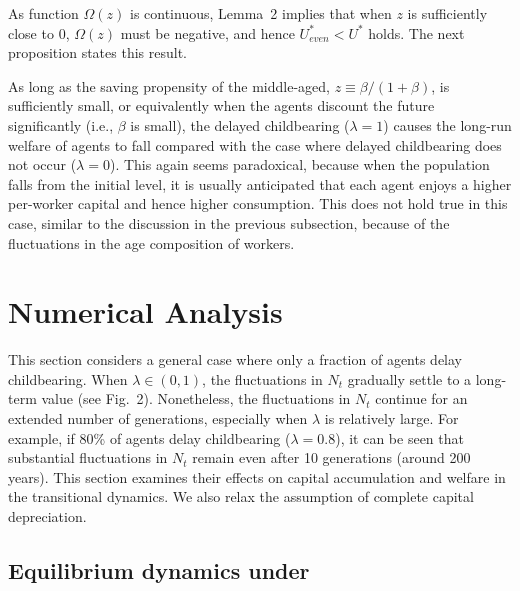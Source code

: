 \documentclass{MBE}%
\begin{document}
{As function $\Omega(z)$ is continuous, Lemma~2 implies that when $z$ is sufficiently close to $0$,
$\Omega(z)$ must be negative, and hence $U^{*}_{even}< U^{*}$ holds. The next proposition states
this result.


As long as the saving propensity of the middle-aged, $z\equiv\beta/(1+\beta)$,
is sufficiently small, or equivalently when the agents discount the future
significantly (i.e., $\beta$ is small), the delayed childbearing ($\lambda=1$)
causes the long-run welfare of agents to fall compared with the case where
delayed childbearing does not occur ($\lambda=0$). This again seems
paradoxical, because when the population falls from the initial level, it is
usually anticipated that each agent enjoys a higher per-worker capital and
hence higher consumption. This does not hold true in this case, similar to the
discussion in the previous subsection, because of the fluctuations in the age
composition of workers.

\section{Numerical Analysis\label{sec:Numerical}}

This section considers a general case where only a fraction of agents delay childbearing. When
$\lambda\in(0,1)$, the fluctuations in $N_{t}$ gradually settle to a long-term value (see Fig.~2).
Nonetheless, the fluctuations in $N_{t}$ continue for an extended number of generations,
especially when $\lambda$ is relatively large. {For example, if 80\% of agents delay childbearing
($\lambda=0.8$), it can be seen that substantial fluctuations in $N_{t}$ remain even after 10
generations (around 200 years).} This section examines their effects on capital accumulation and
welfare in the transitional dynamics. We also relax the assumption of complete capital
depreciation.

\subsection{Equilibrium dynamics under \label{subsec:numerical_k}}

}
\end{document}
